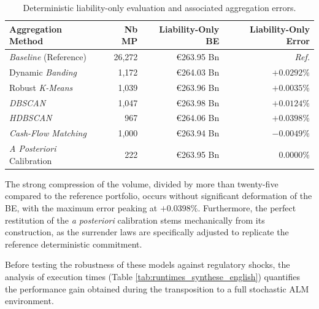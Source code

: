 \begin{table}[H]
    \centering
    \renewcommand{\arraystretch}{1.4}
    \begin{tabular}{|l|r|r|r|}
        \hline
        \textbf{Aggregation Method} & \textbf{Nb MP} & \textbf{Liability-Only BE} & \textbf{Liability-Only Error} \\
        \hline
        \textit{Baseline} (Reference) & 26,272 & €263.95 Bn & \textit{Ref.} \\
        Dynamic \textit{Banding} & 1,172 & €264.03 Bn & $+0.0292\%$ \\
        Robust \textit{K-Means} & 1,039 & €263.96 Bn & $+0.0035\%$ \\
        \textit{DBSCAN} & 1,047 & €263.98 Bn & $+0.0124\%$ \\
        \textit{HDBSCAN} & 967 & €264.06 Bn & $+0.0398\%$ \\
        \textit{Cash-Flow Matching} & 1,000 & €263.94 Bn & $-0.0049\%$ \\
        \textit{A Posteriori} Calibration & 222 & €263.95 Bn & $0.0000\%$ \\
        \hline
    \end{tabular}
    \caption{Deterministic liability-only evaluation and associated aggregation errors.}
    \label{tab:synthese_calibration_finale_synthese_english}
\end{table}

The strong compression of the volume, divided by more than twenty-five compared to the reference portfolio, occurs without significant deformation of the BE, with the maximum error peaking at $+0.0398\%$. Furthermore, the perfect restitution of the \textit{a posteriori} calibration stems mechanically from its construction, as the surrender laws are specifically adjusted to replicate the reference deterministic commitment.

Before testing the robustness of these models against regulatory shocks, the analysis of execution times (Table \ref{tab:runtimes_synthese_english}) quantifies the performance gain obtained during the transposition to a full stochastic ALM environment.

